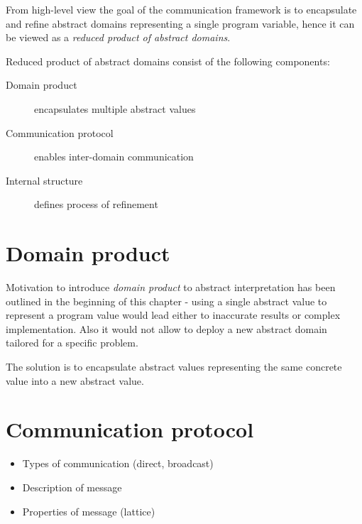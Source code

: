 \documentclass[12pt,oneside]{fithesis2}
\theoremstyle{definition}
\begin{document}
From high-level view the goal of the communication framework is to encapsulate and refine abstract domains representing a single program variable, hence it can be viewed as a \textit{reduced product of abstract domains}.

Reduced product of abstract domains consist of the following components:

\begin{description}
  \item[Domain product] encapsulates multiple abstract values
  \item[Communication protocol] enables inter-domain communication
  \item[Internal structure] defines process of refinement
\end{description}

\section{Domain product}\label{sec:domain-product}

Motivation to introduce \textit{domain product} to abstract interpretation has been outlined in the beginning of this chapter - using a single abstract value to represent a program value would lead either to inaccurate results or complex implementation. Also it would not allow to deploy a new abstract domain tailored for a specific problem. \cite{CousotEtAl06-ASIAN}

The solution is to encapsulate abstract values representing the same concrete value into a new abstract value.

\section{Communication protocol}
\begin{itemize}
  \item Types of communication (direct, broadcast)
  \item Description of message
  \item Properties of message (lattice)
\end{itemize}
\end{document}
